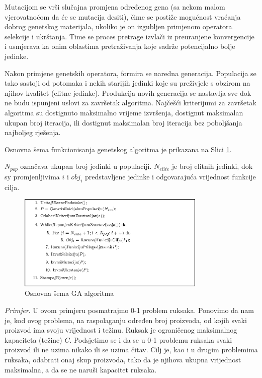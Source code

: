\documentclass[a4paper, utf8, 11pt, colorlinks]{book}
\begin{document}
Mutacijom se vrši slučajna promjena određenog gena (sa nekom malom vjerovatnoćom da će se mutacija desiti), čime se postiže mogućnost vraćanja dobrog genetskog materijala, ukoliko je on izgubljen primjenom operatora selekcije i ukrštanja. Time se proces pretrage izvlači iz preuranjene konvergencije i usmjerava ka onim oblastima pretraživanja koje sadrže potencijalno bolje jedinke.


Nakon primjene genetskih operatora, formira se naredna generacija. Populacija se tako sastoji od potomaka i nekih starijih jedinki koje su preživjele s obzirom na njihov kvalitet (elitne jedinke). Produkcija novih generacija se nastavlja sve dok ne budu ispunjeni uslovi za završetak algoritma. Najčešći kriterijumi za završetak algoritma su dostignuto maksimalno vrijeme izvršenja, dostignut  maksimalan ukupan broj iteracija, ili dostignut maksimalan broj iteracija bez poboljšanja najboljeg rješenja.

Osnovna šema funkcionisanja genetskog algoritma je prikazana na Slici \ref{fig:gascheme}.

$N_{pop}$ označava ukupan broj jedinki u populaciji.  $N_{elite}$ je broj elitnih jedinki, dok sy promjenljivima  $i$ i $obj_{i}$ predstavljene jedinke i odgovarajuća vrijednost funkcije cilja.
\begin{figure}[htp]
	\centering
	\includegraphics[width= 0.8\textwidth]{gasrp2.eps} \caption {Osnovna šema GA algoritma}\label{fig:gascheme}
\end{figure}



\emph{Primjer}. U ovom primjeru posmatrajmo 0-1 problem ruksaka. Ponovimo da nam je, kod ovog problema, na raspolaganju određen broj proizvoda, od kojih svaki proizvod ima svoju vrijednost i težinu. Ruksak je ograničenog maksimalnog kapaciteta (težine) $C$. Podsjetimo se i da se u 0-1 problemu ruksaka svaki proizvod ili ne uzima nikako ili se uzima čitav. Cilj je, kao i u drugim problemima ruksaka, odabrati onaj skup proizvoda, tako da je njihova ukupna vrijednost maksimalna, a da se ne naruši kapacitet ruksaka.
\end{document}
